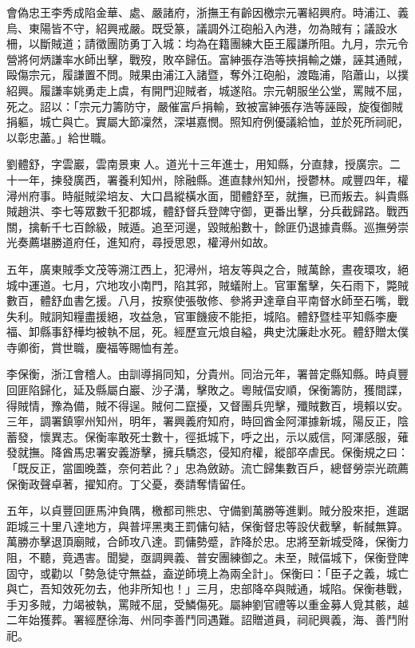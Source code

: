 \begin{pinyinscope}
會偽忠王李秀成陷金華、處、嚴諸府，浙撫王有齡因檄宗元署紹興府。時浦江、義烏、東陽皆不守，紹興戒嚴。既受篆，議調外江砲船入內港，勿為賊有；議設水柵，以斷賊道；請徵團防勇丁入城：均為在籍團練大臣王履謙所阻。九月，宗元令營將何炳謙率水師出擊，戰歿，敗卒歸伍。富紳張存浩等挾捐輸之嫌，誣其通賊，毆傷宗元，履謙置不問。賊果由浦江入諸暨，奪外江砲船，渡臨浦，陷蕭山，以撲紹興。履謙率姚勇走上虞，有開門迎賊者，城遂陷。宗元朝服坐公堂，罵賊不屈，死之。詔以：「宗元力籌防守，嚴催富戶捐輸，致被富紳張存浩等誣毆，旋復御賊捐軀，城亡與亡。實屬大節凜然，深堪嘉憫。照知府例優議給恤，並於死所祠祀，以彰忠藎。」給世職。

劉體舒，字雲巖，雲南景東人。道光十三年進士，用知縣，分直隸，授廣宗。二十一年，揀發廣西，署養利知州，除融縣。進直隸州知州，授鬱林。咸豐四年，權潯州府事。時艇賊梁培友、大口昌縱橫水面，聞體舒至，就撫，已而叛去。糾貴縣賊趙洪、李七等眾數千犯郡城，體舒督兵登陴守御，更番出擊，分兵截歸路。戰西關，擒斬千七百餘級，賊遁。追至河邊，毀賊船數十，餘匪仍退據貴縣。巡撫勞崇光奏薦堪勝道府任，進知府，尋授思恩，權潯州如故。

五年，廣東賊季文茂等溯江西上，犯潯州，培友等與之合，賊萬餘，晝夜環攻，絕城中運道。七月，穴地攻小南門，陷其郛，賊蟻附上。官軍奮擊，矢石雨下，斃賊數百，體舒血書乞援。八月，按察使張敬修、參將尹達章自平南督水師至石嘴，戰失利。賊詗知糧盡援絕，攻益急，官軍饑疲不能拒，城陷。體舒暨桂平知縣李慶福、卸縣事舒樺均被執不屈，死。經歷宣元烺自縊，典史沈廉赴水死。體舒贈太僕寺卿銜，賞世職，慶福等賜恤有差。

李保衡，浙江會稽人。由訓導捐同知，分貴州。同治元年，署普定縣知縣。時貞豐回匪陷歸化，延及縣屬白巖、沙子溝，擊敗之。粵賊偪安順，保衡籌防，獲間諜，得賊情，豫為備，賊不得逞。賊何二竄擾，又督團兵兜擊，殲賊數百，境賴以安。三年，調署鎮寧州知州，明年，署興義府知府，時回酋金阿渾據新城，陽反正，陰蓄發，懷異志。保衡率敢死士數十，徑抵城下，呼之出，示以威信，阿渾感服，薙發就撫。降酋馬忠署安義游擊，擁兵驕恣，侵知府權，縱部卒虐民。保衡規之曰：「既反正，當圖晚蓋，奈何若此？」忠為斂跡。流亡歸集數百戶，總督勞崇光疏薦保衡政聲卓著，擢知府。丁父憂，奏請奪情留任。

五年，以貞豐回匪馬沖負隅，檄都司熊忠、守備劉萬勝等進剿。賊分股來拒，進踞距城三十里八達地方，與普坪黑夷王罰傭句結，保衡督忠等設伏截擊，斬馘無算。萬勝亦擊退頂廟賊，合師攻八達。罰傭勢蹙，詐降於忠。忠將至新城受降，保衡力阻，不聽，竟遇害。聞變，亟調興義、普安團練御之。未至，賊偪城下，保衡登陴固守，或勸以「勢急徒守無益，盍逆師境上為兩全計」。保衡曰：「臣子之義，城亡與亡，吾知效死勿去，他非所知也！」三月，忠部降卒與賊通，城陷。保衡巷戰，手刃多賊，力竭被執，罵賊不屈，受鱗傷死。屬紳劉官禮等以重金募人覓其骸，越二年始獲葬。署經歷徐海、州同李善鬥同遇難。詔贈道員，祠祀興義，海、善鬥附祀。


\end{pinyinscope}
